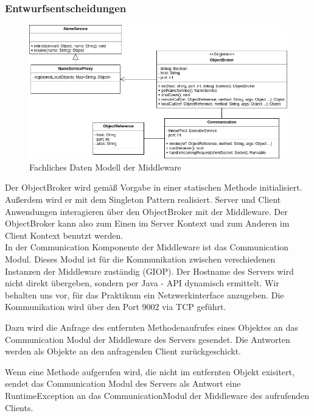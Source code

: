 \documentclass{article}
\begin{document}
\subsubsection{Entwurfsentscheidungen}
\begin{figure}[H]
    \centering
    \includegraphics[width=\textwidth]{Middleware_FDM.png}
    \caption[fdm-middleware]{Fachliches Daten Modell der Middleware}
    \label{fig:fdm-middleware}
\end{figure}

Der ObjectBroker wird gemäß Vorgabe in einer statischen Methode initialisiert. Außerdem wird er mit dem
Singleton Pattern realisiert. Server und Client Anwendungen interagieren über den ObjectBroker mit der Middleware.
Der ObjectBroker kann also zum Einen im Server Kontext und zum Anderen im Client Kontext benutzt werden.\\

In der Communication Komponente der Middleware ist das Communication Modul. Dieses Modul ist für die Kommunikation
zwischen verschiedenen Instanzen der Middleware zuständig (GIOP).
Der Hostname des Servers wird nicht direkt übergeben, sondern per Java - API
dynamisch ermittelt. Wir behalten uns vor, für das Praktikum ein Netzwerkinterface anzugeben.
Die Kommunikation wird über den Port 9002 via TCP geführt. 

Dazu wird die Anfrage des entfernten Methodenaufrufes eines Objektes an das Communication Modul der Middleware des
Servers gesendet. Die Antworten werden als Objekte an den anfragenden Client zurückgeschickt.

Wenn eine Methode aufgerufen wird, die nicht im entfernten Objekt exisitert, sendet das Communication Modul des Servers
als Antwort eine RuntimeException an das CommunicationModul der Middleware des aufrufenden Clients.\\
\end{document}
